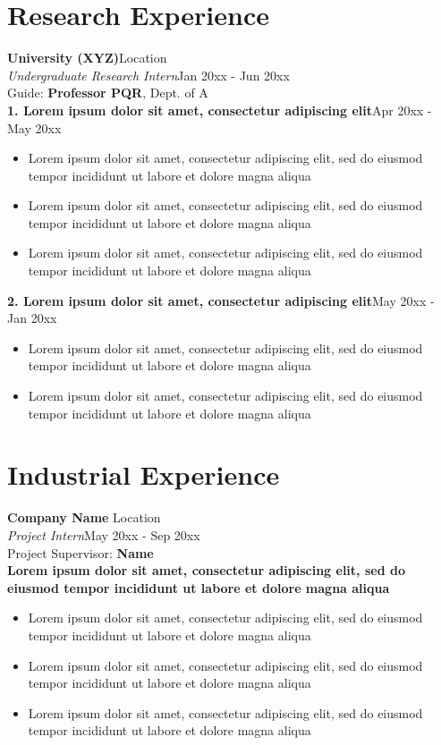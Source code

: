 \documentclass[10pt]{article}
\begin{document}
\section{Research Experience}
	{\bf University (XYZ)}\hfill Location\\
	{\it Undergraduate Research Intern}\hfill Jan 20xx - Jun 20xx\\
	Guide: {\bf Professor PQR}, Dept. of A\\
	{\bf 1.  Lorem ipsum dolor sit amet, consectetur adipiscing elit}\hfill Apr 20xx - May 20xx
	\begin{itemize}
	\setlength\itemsep{0.4px}
	\item{Lorem ipsum dolor sit amet, consectetur adipiscing elit, sed do eiusmod tempor incididunt ut labore et dolore magna aliqua}
	\item{Lorem ipsum dolor sit amet, consectetur adipiscing elit, sed do eiusmod tempor incididunt ut labore et dolore magna aliqua}
	\item{Lorem ipsum dolor sit amet, consectetur adipiscing elit, sed do eiusmod tempor incididunt ut labore et dolore magna aliqua}
	\end{itemize}
	{\bf 2. Lorem ipsum dolor sit amet, consectetur adipiscing elit}\hfill May 20xx - Jan 20xx
	\begin{itemize}
	\setlength\itemsep{0.4px}
	\item{Lorem ipsum dolor sit amet, consectetur adipiscing elit, sed do eiusmod tempor incididunt ut labore et dolore magna aliqua}
	\item{Lorem ipsum dolor sit amet, consectetur adipiscing elit, sed do eiusmod tempor incididunt ut labore et dolore magna aliqua}
	\end{itemize}

\section{Industrial Experience}
	{\bf Company Name} \hfill Location\\
	{\it Project Intern}\hfill  May 20xx - Sep 20xx\\
	Project Supervisor: {\bf Name}\\
	{\bf Lorem ipsum dolor sit amet, consectetur adipiscing elit, sed do eiusmod tempor incididunt ut labore et dolore magna aliqua}
	\begin{itemize}
	\setlength\itemsep{0.4px}
	\item{Lorem ipsum dolor sit amet, consectetur adipiscing elit, sed do eiusmod tempor incididunt ut labore et dolore magna aliqua}
	\item{Lorem ipsum dolor sit amet, consectetur adipiscing elit, sed do eiusmod tempor incididunt ut labore et dolore magna aliqua}
	\item{Lorem ipsum dolor sit amet, consectetur adipiscing elit, sed do eiusmod tempor incididunt ut labore et dolore magna aliqua}
	\end{itemize}
\end{document}
